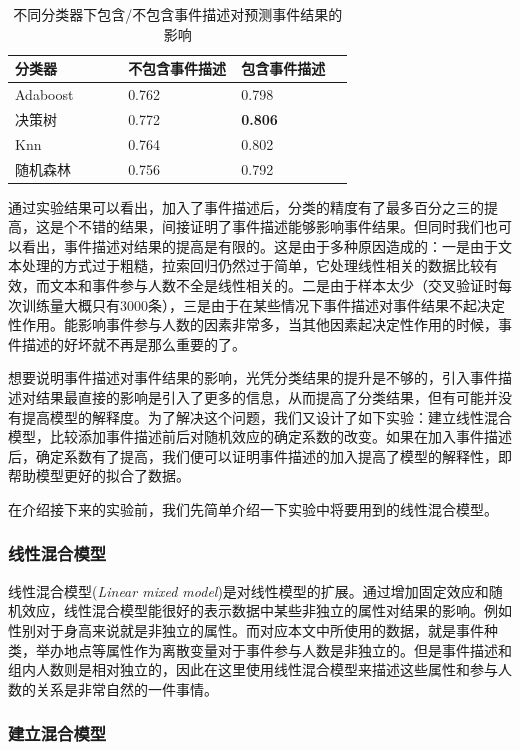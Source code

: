 \documentclass[12pt]{template}
\begin{document}
\begin{table}[htb] 
  \centering
  \caption{\label{t1-3}不同分类器下包含/不包含事件描述对预测事件结果的影响}
  \begin{tabular*}{\linewidth}{p{0.33\linewidth}p{0.33\linewidth}p{0.33\linewidth}}
\toprule 
分类器&不包含事件描述&包含事件描述\\
\midrule
Adaboost & 0.762 & 0.798 \\
决策树& 0.772 & \textbf{0.806} \\
Knn & 0.764 & 0.802  \\
随机森林 & 0.756 & 0.792 \\
\bottomrule
  \end{tabular*}
\end{table}

通过实验结果可以看出，加入了事件描述后，分类的精度有了最多百分之三的提高，这是个不错的结果，间接证明了事件描述能够影响事件结果。但同时我们也可以看出，事件描述对结果的提高是有限的。这是由于多种原因造成的：一是由于文本处理的方式过于粗糙，拉索回归仍然过于简单，它处理线性相关的数据比较有效，而文本和事件参与人数不全是线性相关的。二是由于样本太少（交叉验证时每次训练量大概只有3000条），三是由于在某些情况下事件描述对事件结果不起决定性作用。能影响事件参与人数的因素非常多，当其他因素起决定性作用的时候，事件描述的好坏就不再是那么重要的了。

想要说明事件描述对事件结果的影响，光凭分类结果的提升是不够的，引入事件描述对结果最直接的影响是引入了更多的信息，从而提高了分类结果，但有可能并没有提高模型的解释度。为了解决这个问题，我们又设计了如下实验：建立线性混合模型，比较添加事件描述前后对随机效应的确定系数的改变。如果在加入事件描述后，确定系数有了提高，我们便可以证明事件描述的加入提高了模型的解释性，即帮助模型更好的拟合了数据。

在介绍接下来的实验前，我们先简单介绍一下实验中将要用到的线性混合模型。

\subsubsection{线性混合模型}

线性混合模型(\textit{Linear mixed model})是对线性模型的扩展。通过增加固定效应和随机效应，线性混合模型能很好的表示数据中某些非独立的属性对结果的影响。例如性别对于身高来说就是非独立的属性。而对应本文中所使用的数据，就是事件种类，举办地点等属性作为离散变量对于事件参与人数是非独立的。但是事件描述和组内人数则是相对独立的，因此在这里使用线性混合模型来描述这些属性和参与人数的关系是非常自然的一件事情。

\subsubsection{建立混合模型}
\end{document}
